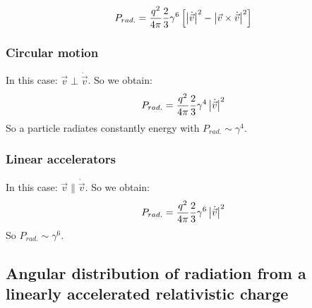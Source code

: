 \begin{align*}
    P_{rad.} = \frac{q^2}{4 \pi} \frac{2}{3} \gamma^6 \left[ \left\vert \dot{\vec{v}} \right\vert^2
        - \left\vert \vec{v} \times \dot{\vec{v}} \right\vert^2 \right]
\end{align*}

\subsubsection{Circular motion}

In this case: $\vec{v} \perp \dot{\vec{v}}$. So we obtain:
\begin{align*}
    P_{rad.} = \frac{q^2}{4 \pi} \frac{2}{3} \gamma^4 \left\vert \dot{\vec{v}} \right\vert^2
\end{align*}
So a particle radiates constantly energy with $P_{rad.} \sim \gamma^4$.

\subsubsection{Linear accelerators}

In this case: $\vec{v} \parallel \dot{\vec{v}}$. So we obtain:
\begin{align*}
    P_{rad.} = \frac{q^2}{4 \pi} \frac{2}{3} \gamma^6 \left\vert \dot{\vec{v}} \right\vert^2
\end{align*}
So $P_{rad.} \sim \gamma^6$.

\subsection{Angular distribution of radiation from a linearly accelerated
relativistic charge}

